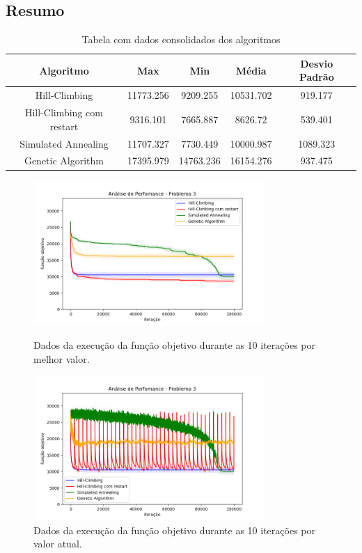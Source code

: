 \subsection{Resumo}

\begin{table}[h!]
\centering
\begin{tabular}{ |c|c|c|c|c|  }
\hline
\rowcolor{lightgray}
Algoritmo & Max & Min & Média & Desvio Padrão \\
\hline
Hill-Climbing & 11773.256 & 9209.255 & 10531.702 & 919.177 \\
\hline
Hill-Climbing com restart & 9316.101 & 7665.887 & 8626.72 & 539.401 \\
\hline
Simulated Annealing & 11707.327 & 7730.449 & 10000.987 & 1089.323 \\
\hline
Genetic Algorithm & 17395.979 & 14763.236 & 16154.276 & 937.475 \\
\hline

\end{tabular}
\caption{Tabela com dados consolidados dos algoritmos}
\end{table}

\begin{figure}[H]
\centering
  \begin{minipage}[b]{0.48\textwidth}
    \includegraphics[width=88mm]{imagens/otima/problema-3-performance-algoritmos-best.png}
    \caption{Dados da execução da função objetivo durante as 10 iterações por melhor valor.
    \label{fig:problema-3-performance-algoritmos-best}}
  \end{minipage}
  \hfill
  \begin{minipage}[b]{0.48\textwidth}
    \includegraphics[width=88mm]{imagens/otima/problema-3-performance-algoritmos-value.png}
    \caption{Dados da execução da função objetivo durante as 10 iterações por valor atual.
    \label{fig:problema-3-performance-algoritmos-value}}
  \end{minipage}
\end{figure}